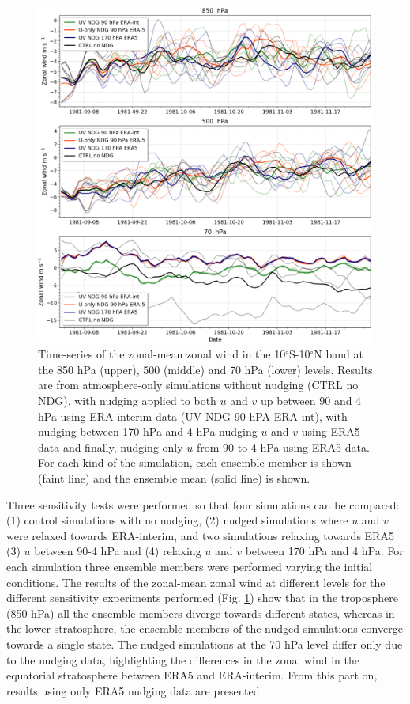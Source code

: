 \begin{figure}[t!]
\centering
 \includegraphics[width=0.95\linewidth]{figures/u_test__.png}
\caption[Time-series of zonal-mean winds under different nudging conditions]{Time-series of the zonal-mean zonal wind in the 10$^\circ$S-10$^\circ$N band at the 850 hPa (upper), 500 (middle) and 70 hPa (lower) levels. Results are from atmosphere-only simulations without nudging (CTRL no NDG), with nudging applied to both $u$ and $v$ up between 90 and 4 hPa using ERA-interim data (UV NDG 90 hPA ERA-int), with nudging between 170 hPa and 4 hPa nudging $u$ and $v$ using ERA5 data and finally, nudging only $u$ from 90 to 4 hPa using ERA5 data. For each kind of the simulation, each ensemble member is shown (faint line) and the ensemble mean (solid line) is shown. }
\label{fig:u_nudg_stv}
\end{figure}

Three sensitivity tests were performed so that four simulations can be compared: (1) control simulations with no nudging, (2) nudged simulations where $u$ and $v$ were relaxed towards ERA-interim, and two simulations relaxing towards ERA5  (3) $u$ between 90-4 hPa and (4) relaxing $u$ and $v$ between 170 hPa and 4 hPa. For each simulation three ensemble members were performed varying the initial conditions.
The results of the zonal-mean zonal wind at different levels for the different sensitivity experiments performed (Fig. \ref{fig:u_nudg_stv}) show that in the troposphere (850 hPa) all the ensemble members diverge towards different states, whereas in the lower stratosphere, the ensemble members of the nudged simulations converge towards a single state. The nudged simulations at the 70 hPa level differ only due to the nudging data, highlighting the differences in the zonal wind in the equatorial stratosphere between ERA5 and ERA-interim. 
From this part on, results using only ERA5 nudging data are presented. 

